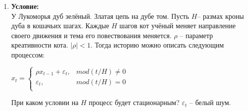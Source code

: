\documentclass[10pt]{article}
\begin{document}
\begin{enumerate}
\textbf{Решение:}
\begin{enumerate}
    \item $b_{101} = 0.8b_{100} + 0.3u_{101} \Rightarrow \mathbb{E}(b_{101}|\mathcal{F}_{100}) = 0.8 + 0.3u_{101}$ \\
    $\ell_{101} = \ell_{100} + 0.8b_{100} + 0.2u_{101} \Rightarrow  \mathbb{E}(\ell_{101}|\mathcal{F}_{100}) = 20 + 0.8 + 0.2u_{101} = 20.8 + 0.2u_{101}$ \\
    $y_{102} = \ell_{101} + 0.8b_{101} + u_{102} = (\ell_{100} + 0.8b_{100} + 0.2u_{101}) + 0.8(0.8b_{100} + 0.3u_{101}) + u_{102} =
    \ell_{100} + 1.44b_{100} + 0.44u_{101} + u_{102} \Rightarrow \mathbb{E}(y_{102}|\mathcal{F}_{100}) = 20 + 1.44 \cdot 1 + 0.44u_{101} + u_{102} =
    21.44 + 0.44u_{101} + u_{102}$
    Заметим, что $u_{101}$ и $u_{102}$ -- некоррелированные, откуда $0.44u_{101} + u_{102}\sim\mathcal{N}(0; 0.44^2 \cdot 20 + 20) = \mathcal{N}(0; 23.872)$. \\
    $\mathbb{E}(y_{102}|\mathcal{F}_100) \sim \mathcal{N}(21.44; 23.872)\Rightarrow$; с вероятностью $0.95:$
    $$y_{102}\in(21.44 - 1.96\cdot\sqrt{23.872}; 21.44 + 1.96\cdot\sqrt{23.872})\approx(11.86; 31.02)$$

    \item В качестве прогноза модели для шага $y_{2025}$ будем использовать $\mathbb{E}(y_{2025}|\mathcal{F}_100)$, заметим, что на каждом шаге к
    $y_t$ прибавляются слагаемых $u_t$, а через $\ell_{t-1}$ с $b_{t-1}$ прибавляются и $u_{t-1}$. Однако, они будут присутствовать в равенстве в первых
    степенях и в силу $\mathbb{E}u_t = 0$ сократятся. Значит, для поиска математического ожидания достаточно выразить $y_{2025}$ через $\ell_{100}$ и $b_{100}$,
    опустив $u_t$.\\
    Тогда $y_{t} = \ell_{t-1} + 0.8b_{t-1} = (\ell_{t-2} + 0.8b_{t-2}) + 0.8\cdot 0.8b_{t-2} = \hdots = \ell_{t-k} + b_{t-k}\sum\limits_{i=1}^k 0.8^i =
    \ell_{t-k} + b_{t-k} \frac{0.8 - 0.8^{k+1}}{1 - 0.8}$.
    $y_{2025} = \ell_{2025 - 1925} + b_{2025 - 1925}\cdot\frac{0.8 - 0.8^{1926}}{1 - 0.8} \approx \ell_{100} + b_{100} \cdot \frac{0.8}{0.2} = \ell_{100} + 4b_{100} = 24$
\end{enumerate}

\item \textbf{Условие:}\\
У Лукоморья дуб зелёный. Златая цепь на дубе том. Пусть $H$-- размах кроны дуба в кошачьих шагах.
Каждые $H$ шагов кот учёный меняет направление своего движения и тема его повествования меняется.
$\rho$ -- параметр креативности кота. $|\rho|<1$. Тогда историю можно описать следующим процессом:
\begin{center}
    \begin{math}
        x_t =
        \begin{cases}
            \rho x_{t-1} + \varepsilon_t, & mod(t/H) \not= 0 \\
            \varepsilon_t, & mod(t/H) = 0 \\
        \end{cases}
    \end{math}
\end{center}
При каком условии на $H$ процесс будет стационарным? $\varepsilon_t$ -- белый шум.


\end{enumerate}
\end{document}
